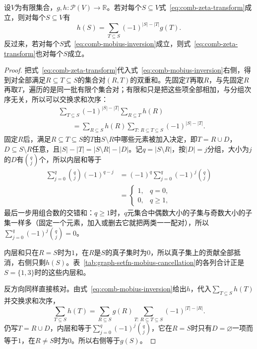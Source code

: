 \begin{theorem}
\label{thm:comb-mobius-inversion}
设$V$为有限集合，$g,h:\mathcal P(V)\to\mathbb R$。若对每个$S\subseteq V$式~\eqref{eq:comb-zeta-transform}成立，则对每个$S\subseteq V$有
\begin{equation}
  h(S)=\sum_{T\subseteq S}(-1)^{|S|-|T|}g(T).
  \label{eq:comb-mobius-inversion}
\end{equation}
反过来，若对每个$S$式~\eqref{eq:comb-mobius-inversion}成立，则式~\eqref{eq:comb-zeta-transform}也对每个$S$成立。
\end{theorem}

\begin{proof}
把式~\eqref{eq:comb-zeta-transform}代入式~\eqref{eq:comb-mobius-inversion}右侧，得到对全部满足$R\subseteq T\subseteq S$的集合对$(R,T)$的双重和。先固定$T$再取$R$，与先固定$R$再取$T$，遍历的是同一批有限个集合对；有限和只是把这些项全部相加，与分组次序无关，所以可以交换求和次序：
\[
  \begin{aligned}
  &\sum_{T\subseteq S}(-1)^{|S|-|T|}\sum_{R\subseteq T}h(R)\\
  &\qquad=\sum_{R\subseteq S}h(R)\sum_{T:\,R\subseteq T\subseteq S}(-1)^{|S|-|T|}.
  \end{aligned}
\]
固定$R$后，满足$R\subseteq T\subseteq S$的$T$由$S\setminus R$中哪些元素被加入决定，即$T=R\cup D$，$D\subseteq S\setminus R$任意，且$|S|-|T|=|S\setminus R|-|D|$。记$q=|S\setminus R|$，按$|D|=j$分组，大小为$j$的$D$有$\binom qj$个，所以内层和等于
\[
  \begin{aligned}
  \sum_{j=0}^{q}\binom qj(-1)^{q-j}&=(-1)^q\sum_{j=0}^{q}(-1)^j\binom qj\\
  &=\begin{cases}1,&q=0,\\0,&q\geq1,\end{cases}
  \end{aligned}
\]
最后一步用组合数的交错和：$q\geq1$时，$q$元集合中偶数大小的子集与奇数大小的子集一样多（固定一个元素，加入或删去它就把两类一一配对），所以$\sum_{j=0}^{q}(-1)^j\binom qj=0$。

内层和只在$R=S$时为$1$，在$R$是$S$的真子集时为$0$，所以真子集上的贡献全部抵消，右侧只剩$h(S)$。表~\ref{tab:graph-setfn-mobius-cancellation}的各列合计正是$S=\{1,3\}$时的这些内层和。

反方向同样直接核对。由式~\eqref{eq:comb-mobius-inversion}给出$h$，代入$\sum_{T\subseteq S}h(T)$并交换求和次序，
\[
  \sum_{T\subseteq S}h(T)=\sum_{R\subseteq S}g(R)\sum_{T:\,R\subseteq T\subseteq S}(-1)^{|T|-|R|}.
\]
仍写$T=R\cup D$，内层和等于$\sum_{j=0}^{q}(-1)^j\binom qj$，它在$R=S$时只有$D=\varnothing$一项而等于$1$，在$R\neq S$时为$0$。所以右侧等于$g(S)$。
\end{proof}

